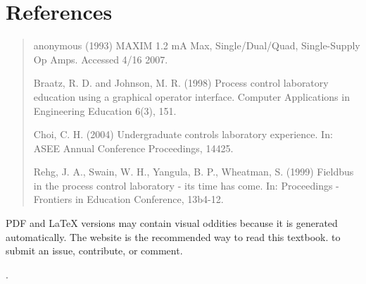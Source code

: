 \documentclass[letterpaper,10pt,english]{sphinxmanual}
\begin{document}
\section{References}
\label{\detokenize{ProCoDA/ProCoDA:references}}\begin{quote}

anonymous (1993) MAXIM 1.2 mA Max, Single/Dual/Quad, Single-Supply Op Amps. Accessed 4/16 2007. 

Braatz, R. D. and Johnson, M. R. (1998) Process control laboratory education using a graphical operator interface. Computer Applications in Engineering Education 6(3), 151.

Choi, C. H. (2004) Undergraduate controls laboratory experience. In: ASEE Annual Conference Proceedings, 14425.

Rehg, J. A., Swain, W. H., Yangula, B. P., Wheatman, S. (1999) Fieldbus in the process control laboratory - its time has come. In: Proceedings - Frontiers in Education Conference, 13b4-12.
\end{quote}

\begin{footnote}[1]\sphinxAtStartFootnote
PDF and LaTeX versions may contain visual oddities because it is generated automatically. The website is the recommended way to read this textbook.  to submit an issue, contribute, or comment.
%
\end{footnote}.
\paragraph{}



\renewcommand{\indexname}{Index}
\printindex
\end{document}
